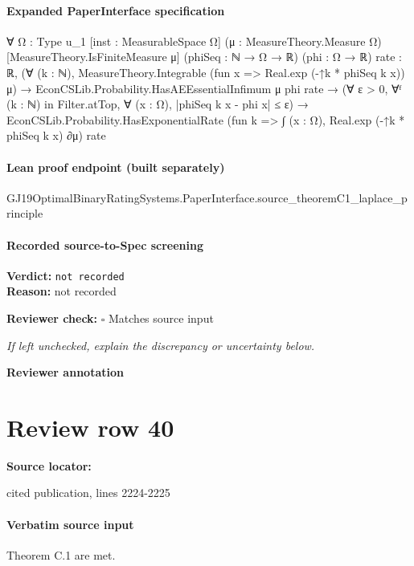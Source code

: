 \documentclass[10pt]{article}
\newcommand{\reviewerbox}{%
  \par\noindent\fbox{\parbox{0.96\linewidth}{\rule{0pt}{0.38in}}}\par
}
\newcommand{\reviewmatch}[1]{%
  \par\noindent\textbf{Reviewer check:} $\square$\; #1\par
  \noindent\emph{If left unchecked, explain the discrepancy or uncertainty below.}\par
}
\begin{document}
\paragraph{Expanded PaperInterface specification}
\begin{ReviewVerbatim}
∀ {Ω : Type u_1} [inst : MeasurableSpace Ω] (μ : MeasureTheory.Measure Ω) [MeasureTheory.IsFiniteMeasure μ]
  (phiSeq : ℕ → Ω → ℝ) (phi : Ω → ℝ) {rate : ℝ},
  (∀ (k : ℕ), MeasureTheory.Integrable (fun x => Real.exp (-↑k * phiSeq k x)) μ) →
    EconCSLib.Probability.HasAEEssentialInfimum μ phi rate →
      (∀ ε > 0, ∀ᶠ (k : ℕ) in Filter.atTop, ∀ (x : Ω), |phiSeq k x - phi x| ≤ ε) →
        EconCSLib.Probability.HasExponentialRate (fun k => ∫ (x : Ω), Real.exp (-↑k * phiSeq k x) ∂μ) rate
\end{ReviewVerbatim}

\paragraph{Lean proof endpoint (built separately)}\begin{ReviewVerbatim}
GJ19OptimalBinaryRatingSystems.PaperInterface.source_theoremC1_laplace_principle
\end{ReviewVerbatim}

\paragraph{Recorded source-to-Spec screening}
\textbf{Verdict:} \texttt{not recorded}
\\
\textbf{Reason:} not recorded
\reviewmatch{Matches source input}
\noindent\textbf{Reviewer annotation}\par
\reviewerbox
\clearpage
\hypertarget{source-claim-16ee341855124303}{}
\section*{Review row 40}
\textbf{Source locator:} {\footnotesize\raggedright cited publication, lines 2224-\allowbreak{}2225\par}
\paragraph{Verbatim source input}
\begin{ReviewVerbatim}
Theorem C.1 are met.
\end{ReviewVerbatim}
\end{document}
